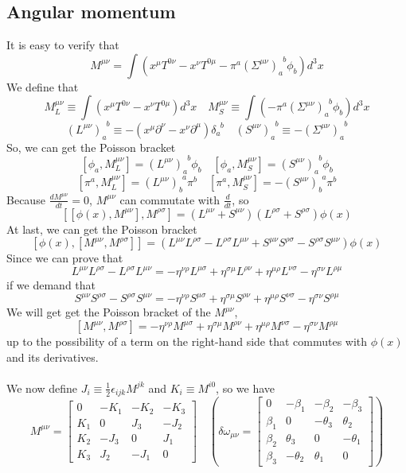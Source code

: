 \documentclass[cyan]{elegantnote}
\begin{document}
\subsection{Angular momentum}

It is easy to verify that
\[M^{\mu \nu} = \int (x^{\mu}T^{0\nu}-x^{\nu}T^{0\mu}-\pi^a(\Sigma^{\mu \nu})_{a}^{\phantom{a}b}\phi_b) d^3 x\]
We define that
\[M_{L}^{\mu \nu} \equiv \int (x^{\mu}T^{0\nu}-x^{\nu}T^{0\mu}) d^3 x \quad M_S^{\mu \nu} \equiv \int (-\pi^a(\Sigma^{\mu \nu})_{a}^{\phantom{a}b}\phi_b) d^3 x\]
\[(L^{\mu \nu})_a^{\phantom{a}b} \equiv -(x^{\mu}\partial^{\nu}-x^{\nu}\partial^{\mu})\delta_a^{\phantom{a}b} \quad (S^{\mu \nu})_a^{\phantom{a}b} \equiv -(\Sigma^{\mu \nu})_a^{\phantom{a}b}\]
So, we can get the Poisson bracket
\[[\phi_a,M_L^{\mu \nu}] = (L^{\mu \nu})_a^{\phantom{a}b} \phi_b \quad [\phi_a,M_S^{\mu \nu}] = (S^{\mu \nu})_a^{\phantom{a}b} \phi_b\]
\[[\pi^a,M_L^{\mu \nu}] = (L^{\mu \nu})_b^{\phantom{b}a}\pi^{b}  \quad [\pi^a,M_S^{\mu \nu}] = - (S^{\mu \nu})_b^{\phantom{b}a} \pi^b \]
Because $\frac{d M^{\mu \nu}}{dt} = 0$, $M^{\mu \nu}$ can commutate with $\frac{d}{dt}$, so
\[[[\phi(x),M^{\mu \nu}],M^{\rho \sigma}] = (L^{\mu \nu}+S^{\mu \nu})(L^{\rho \sigma}+S^{\rho \sigma})\phi(x)\]
At last, we can get the Poisson bracket 
\[[\phi(x),[M^{\mu \nu},M^{\rho \sigma}]] = (L^{\mu \nu}L^{\rho \sigma}-L^{\rho \sigma}L^{\mu \nu} + S^{\mu \nu}S^{\rho \sigma}-S^{\rho \sigma}S^{\mu \nu})\phi(x)\]
Since we can prove that
\[L^{\mu \nu}L^{\rho \sigma}-L^{\rho \sigma}L^{\mu \nu} = -\eta^{\nu \rho}L^{\mu \sigma} + \eta^{\sigma \mu}L^{\rho \nu} + \eta^{\mu \rho}L^{\nu \sigma} - \eta^{\sigma \nu}L^{\rho \mu}\]
if we demand that
\[S^{\mu \nu}S^{\rho \sigma}-S^{\rho \sigma}S^{\mu \nu} = -\eta^{\nu \rho}S^{\mu \sigma} + \eta^{\sigma \mu}S^{\rho \nu} + \eta^{\mu \rho}S^{\nu \sigma} - \eta^{\sigma \nu}S^{\rho \mu}\]
We will get get the Poisson bracket of the $M^{\mu \nu}$,
\[[M^{\mu \nu},M^{\rho \sigma}] = -\eta^{\nu \rho}M^{\mu \sigma} + \eta^{\sigma \mu}M^{\rho \nu} + \eta^{\mu \rho}M^{\nu \sigma} - \eta^{\sigma \nu}M^{\rho \mu}\]
up to the possibility of a term on the right-hand side that commutes with $\phi(x)$ and its derivatives.\\ \\
We now define $J_i \equiv \frac{1}{2} \epsilon_{ijk} M^{jk}$ and $K_i \equiv M^{i0}$, so we have
\[M^{\mu \nu} = \left[ 
\begin{matrix} 
0   & -K_1 & -K_2 & -K_3 \\ 
K_1 & 0    & J_3  & -J_2 \\
K_2 & -J_3 & 0    &  J_1 \\
K_3 & J_2  & -J_1 &  0
\end{matrix} 
\right] \quad \left( 
\delta \omega_{\mu\nu} = \left[
\begin{matrix} 
0       & -\beta_1   & -\beta_2   & -\beta_3   \\ 
\beta_1 & 0         & -\theta_3 & \theta_2  \\
\beta_2 & \theta_3  & 0         & -\theta_1 \\
\beta_3 & -\theta_2 & \theta_1  & 0
\end{matrix} 
\right] \right)\] 
\end{document}
